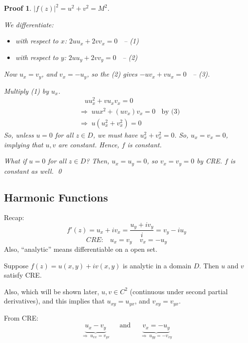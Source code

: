 \documentclass[12pt,titlepage]{article}
\newtheorem{protoproof}[prototheorem]{Proof}
\renewenvironment{proof}
{\colorlet{shadecolor}{blue!15}\begin{shaded}\begin{protoproof}\normalfont}{\qed\end{protoproof}\end{shaded}}
\begin{document}
\begin{proof}
	$|f(z)|^2 = u^2 + v^2 = M^2$. 

	We differentiate: \begin{itemize}
		\item with respect to $x$: $2uu_x + 2vv_x = 0$ $\;\;$-- (1)
		\item with respect to $y$: $2uu_y + 2vv_y = 0$ $\;\;$-- (2)
	\end{itemize}
	Now $u_x = v_y$, and $v_x = -u_y$, so the (2) gives $-uv_x + vu_x = 0$ $\;\;$-- (3). 

	Multiply (1) by $u_x$. \begin{align*}
		&\;\;\; uu_x^2 + vu_xv_x = 0\\
		& \Rightarrow \; uux^2 + (uv_x)v_x = 0 \;\;\text{ by (3)}\\
		& \Rightarrow \; u(u_x^2+v_x^2) = 0
	\end{align*}
	So, unless $u = 0$ for all $z \in D$, we must have $u_x^2 + v_x^2 = 0$. So, $u_x = v_x = 0$, implying that $u, v$ are constant. Hence, $f$ is constant. 

	What if $u = 0$ for all $z \in D$? Then, $u_x = u_y = 0$, so $v_x = v_y = 0$ by CRE. $f$ is constant as well. 
\end{proof}
\subsection{Harmonic Functions}
Recap: $$f'(z) = u_x + iv_x = \dfrac{u_y+iv_y}{i} = v_y - iu_y$$
$$CRE: \;\;\; u_x = v_y \;\;\;\; v_x = -u_y$$
Also, ``analytic'' means differentiable on a open set. 

Suppose $f(z) = u(x,y) + iv(x,y)$ is analytic in a domain $D$. Then $u$ and $v$ satisfy CRE. 

Also, which will be shown later, $u, v \in C^2$ (continuous under second partial derivatives), and this implies that $u_{xy} = u_{yx}$, and $v_{xy} = v_{yx}$. 

From CRE: $$\underbrace{u_x- v_y}_{\Rightarrow \; u_{xx} = v_{yx}} \;\;\;\; \text{ and } \;\;\;\; \underbrace{v_x = -u_y}_{\Rightarrow \; u_{yy} = -v_{xy}}$$
\end{document}
